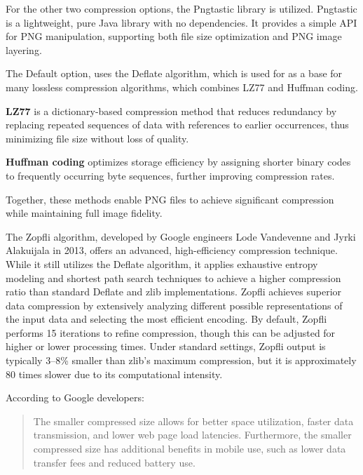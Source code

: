 For the other two compression options, the Pngtastic library is utilized. Pngtastic is a lightweight, pure Java library with no dependencies. It provides a simple API for PNG manipulation, supporting both file size optimization and PNG image layering.

The Default option, uses the Deflate algorithm, which is used for as a base for many lossless compression algorithms, which combines LZ77 and Huffman coding.

\begin{compactitem}
\item{}\textbf{LZ77} is a dictionary-based compression method that reduces redundancy by replacing repeated sequences of data with references to earlier occurrences, thus minimizing file size without loss of quality.
\item{}\textbf{Huffman coding} optimizes storage efficiency by assigning shorter binary codes to frequently occurring byte sequences, further improving compression rates.
\end{compactitem}

Together, these methods enable PNG files to achieve significant compression while maintaining full image fidelity.

The Zopfli algorithm, developed by Google engineers Lode Vandevenne and Jyrki Alakuijala in 2013, offers an advanced, high-efficiency compression technique. While it still utilizes the Deflate algorithm, it applies exhaustive entropy modeling and shortest path search techniques to achieve a higher compression ratio than standard Deflate and zlib implementations. Zopfli achieves superior data compression by extensively analyzing different possible representations of the input data and selecting the most efficient encoding. By default, Zopfli performs 15 iterations to refine compression, though this can be adjusted for higher or lower processing times. Under standard settings, Zopfli output is typically 3–8\% smaller than zlib’s maximum compression, but it is approximately 80 times slower due to its computational intensity.

According to Google developers: \cite{ZopfliGoogleBlog}

\begin{quote}
    The smaller compressed size allows for better space utilization, faster data transmission, and lower web page load latencies. Furthermore, the smaller compressed size has additional benefits in mobile use, such as lower data transfer fees and reduced battery use.
\end{quote}


